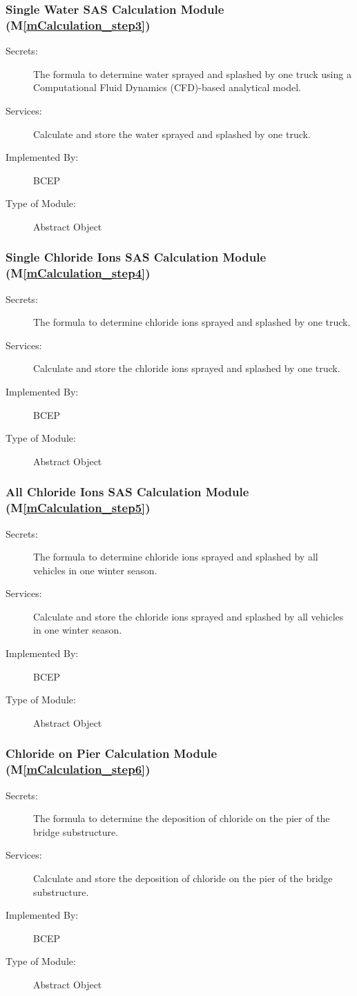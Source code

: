 \documentclass[12pt, titlepage]{article}
\newcommand{\mref}[1]{M\ref{#1}}
\begin{document}
\subsubsection{Single Water SAS Calculation Module (\mref{mCalculation_step3})}
\begin{description}
\item[Secrets:] The formula to determine water sprayed and splashed by one truck using a Computational Fluid Dynamics (CFD)-based analytical model.
\item[Services:] Calculate and store the water sprayed and splashed by one truck.
\item[Implemented By:] BCEP
\item[Type of Module:] Abstract Object
\end{description}

\subsubsection{Single Chloride Ions SAS Calculation Module (\mref{mCalculation_step4})}
\begin{description}
\item[Secrets:] The formula to determine chloride ions sprayed and splashed by one truck.
\item[Services:] Calculate and store the chloride ions sprayed and splashed by one truck.
\item[Implemented By:] BCEP
\item[Type of Module:] Abstract Object
\end{description}

\subsubsection{All Chloride Ions SAS Calculation Module (\mref{mCalculation_step5})}
\begin{description}
\item[Secrets:] The formula to determine chloride ions sprayed and splashed by all vehicles in one winter season.
\item[Services:] Calculate and store the chloride ions sprayed and splashed by all vehicles in one winter season.
\item[Implemented By:] BCEP
\item[Type of Module:] Abstract Object
\end{description}

\subsubsection{Chloride on Pier Calculation Module (\mref{mCalculation_step6})}
\begin{description}
\item[Secrets:] The formula to determine the deposition of chloride on the pier of the bridge substructure.
\item[Services:] Calculate and store the deposition of chloride on the pier of the bridge substructure.
\item[Implemented By:] BCEP
\item[Type of Module:] Abstract Object
\end{description}
\end{document}

